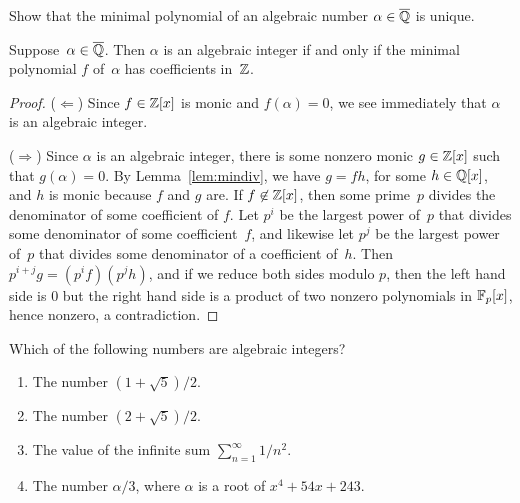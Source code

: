 \begin{exercise}
	Show that the minimal polynomial of an algebraic number $\alpha\in\overline{\mathbb{Q}}$ is unique. 
\end{exercise}

\begin{lemma}\label{lem:minpolint}
Suppose~$\alpha \in\overline{\mathbb{Q}}$. Then $\alpha$ is an algebraic integer if and only
if the minimal polynomial $f$ of~$\alpha$ has coefficients in~$\mathbb{Z}$.
\end{lemma}
\begin{proof}
($\Longleftarrow$) Since $f\in \mathbb{Z}[x]$ is monic and $f(\alpha)=0$, we see immediately
that $\alpha$ is an algebraic integer.

($\Longrightarrow$) Since $\alpha$ is an algebraic integer, there is
  some nonzero monic $g\in\mathbb{Z}[x]$ such that $g(\alpha)=0$.
  By Lemma~\ref{lem:mindiv}, we have $g=fh$, for some $h\in\mathbb{Q}[x]$, and
  $h$ is monic because $f$ and $g$ are.  If $f\not\in\mathbb{Z}[x]$, then some
  prime~$p$ divides the denominator of some coefficient of $f$.  Let
  $p^i$ be the largest power of~$p$ that divides some denominator of
  some coefficient~$f$, and likewise let $p^j$ be the largest power
  of~$p$ that divides some denominator of a coefficient of~$h$.  Then
  $p^{i+j}g = (p^if)(p^j h)$, and if we reduce both sides modulo $p$,
  then the left hand side is $0$ but the right hand side is a product
  of two nonzero polynomials in $\mathbb{F}_p[x]$, hence nonzero, a
  contradiction.
\end{proof}

\begin{exercise}
	Which of the following numbers are algebraic integers?
	\begin{enumerate}
		\item The number $(1+\sqrt{5})/2$.
		\item The number $(2+\sqrt{5})/2$.
		\item The value of the infinite sum $\sum_{n=1}^{\infty} 1/n^2$.
		\item The number $\alpha/3$, where $\alpha$ is a root of 
		$x^4 + 54x + 243$.
	\end{enumerate}
\end{exercise}

